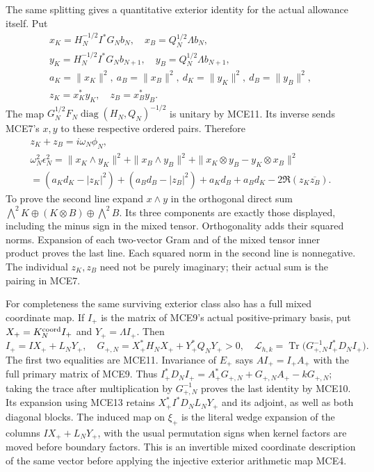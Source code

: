 \documentclass[11pt,a4paper]{article}
\begin{document}
The same splitting gives a quantitative exterior identity for the
actual allowance itself. Put
\[
 \begin{gathered}
 x_K=H_N^{-1/2}I^*G_Nb_N,\quad x_B=Q_N^{1/2}\Lambda b_N,\\
 y_K=H_N^{-1/2}I^*G_Nb_{N+1},\quad y_B=Q_N^{1/2}\Lambda b_{N+1},\\
 a_K=\|x_K\|^2,\ a_B=\|x_B\|^2,\ d_K=\|y_K\|^2,\ d_B=\|y_B\|^2,\\
 z_K=x_K^*y_K,\quad z_B=x_B^*y_B.
 \end{gathered}\tag{MCE15}
\]
The map $G_N^{1/2}F_N\operatorname{diag}(H_N,Q_N)^{-1/2}$
is unitary by MCE11. Its inverse sends MCE7's $x,y$ to these
respective ordered pairs. Therefore
\[
 \begin{gathered}
 z_K+z_B=i\omega_N\phi_N,\\
 \omega_N^2\epsilon_N^2
   =\|x_K\wedge y_K\|^2+\|x_B\wedge y_B\|^2
                     +\|x_K\otimes y_B-y_K\otimes x_B\|^2\\
   =(a_Kd_K-|z_K|^2)+(a_Bd_B-|z_B|^2)
                       +a_Kd_B+a_Bd_K-2\Re(z_K\overline{z_B}).
 \end{gathered}\tag{MCE16}
\]
To prove the second line expand $x\wedge y$ in the orthogonal
direct sum $\bigwedge^2K\oplus(K\otimes B)\oplus\bigwedge^2B$.
Its three components are exactly those displayed, including the
minus sign in the mixed tensor. Orthogonality adds their squared
norms. Expansion of each two-vector Gram and of the mixed tensor
inner product proves the last line. Each squared norm in the
second line is nonnegative. The individual $z_K,z_B$ need not be
purely imaginary; their actual sum is the pairing in MCE7.

For completeness the same surviving exterior class also has a full
mixed coordinate map. If $I_+$ is the matrix of MCE9's actual
positive-primary basis, put
$X_+=K_N^{\rm coord}I_+$ and $Y_+=\Lambda I_+$. Then
\[
 I_+=IX_++L_NY_+,\quad
 G_{+,N}=X_+^*H_NX_++Y_+^*Q_NY_+>0,
 \quad
 \mathcal L_{h,k}
   =\operatorname{Tr}\bigl(G_{+,N}^{-1}I_+^*D_NI_+\bigr).
 \tag{MCE17}
\]
The first two equalities are MCE11. Invariance of $E_+$ says
$AI_+=I_+A_+$ with the full primary matrix of MCE9. Thus
$I_+^*D_NI_+=A_+^*G_{+,N}+G_{+,N}A_+-kG_{+,N}$;
taking the trace after multiplication by $G_{+,N}^{-1}$ proves
the last identity by MCE10. Its expansion using MCE13 retains
$X_+^*I^*D_NL_NY_+$ and its adjoint, as well as both diagonal
blocks. The induced map on $\xi_+$ is the literal wedge expansion
of the columns $IX_++L_NY_+$, with the usual permutation signs
when kernel factors are moved before boundary factors. This is
an invertible mixed coordinate description of the same vector
before applying the injective exterior arithmetic map MCE4.
\end{document}
